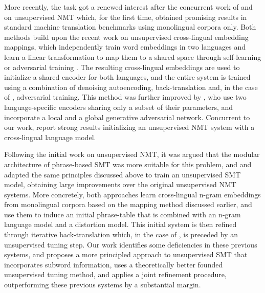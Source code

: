 \documentclass[11pt,a4paper]{article}
\begin{document}
More recently, the task got a renewed interest after the concurrent work of \citet{artetxe2018unmt} and \citet{lample2018unsupervised} on unsupervised NMT which, for the first time, obtained promising results in standard machine translation benchmarks using monolingual corpora only. Both methods build upon the recent work on unsupervised cross-lingual embedding mappings, which independently train word embeddings in two languages and learn a linear transformation to map them to a shared space through self-learning \citep{artetxe2017learning,artetxe2018robust} or adversarial training \citep{conneau2018word}. The resulting cross-lingual embeddings are used to initialize a shared encoder for both languages, and the entire system is trained using a combination of denoising autoencoding, back-translation and, in the case of \citet{lample2018unsupervised}, adversarial training. This method was further improved by \citet{yang2018unsupervised}, who use two language-specific encoders sharing only a subset of their parameters, and incorporate a local and a global generative adversarial network. Concurrent to our work, \citet{lample2019cross} report strong results initializing an unsupervised NMT system with a cross-lingual language model.

Following the initial work on unsupervised NMT, it was argued that the modular architecture of phrase-based SMT was more suitable for this problem, and \citet{lample2018phrase} and \citet{artetxe2018usmt} adapted the same principles discussed above to train an unsupervised SMT model, obtaining large improvements over the original unsupervised NMT systems. More concretely, both approaches learn cross-lingual n-gram embeddings from monolingual corpora based on the mapping method discussed earlier, and use them to induce an initial phrase-table that is combined with an n-gram language model and a distortion model. This initial system is then refined through iterative back-translation \citep{sennrich2016improving} which, in the case of \citet{artetxe2018usmt}, is preceded by an unsupervised tuning step. Our work identifies some deficiencies in these previous systems, and proposes a more principled approach to unsupervised SMT that incorporates subword information, uses a theoretically better founded unsupervised tuning method, and applies a joint refinement procedure, outperforming these previous systems by a substantial margin.
\end{document}
